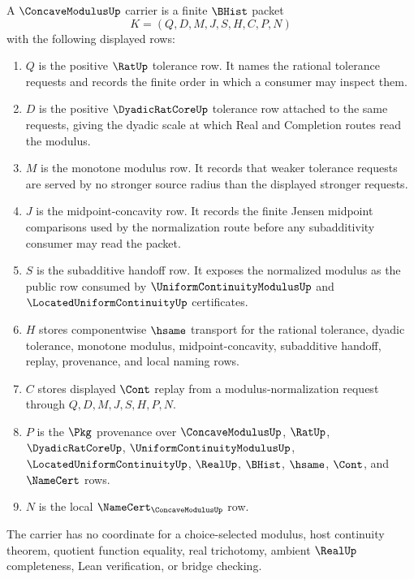 \begin{definition}
\label{def:concave-modulus-carrier}
A $\ConcaveModulusUp$ carrier is a finite $\BHist$ packet
$$
K=(Q,D,M,J,S,H,C,P,N)
$$
with the following displayed rows:
\begin{enumerate}
\item $Q$ is the positive $\RatUp$ tolerance row. It names the rational tolerance requests and records the finite order in which a consumer may inspect them.
\item $D$ is the positive $\DyadicRatCoreUp$ tolerance row attached to the same requests, giving the dyadic scale at which Real and Completion routes read the modulus.
\item $M$ is the monotone modulus row. It records that weaker tolerance requests are served by no stronger source radius than the displayed stronger requests.
\item $J$ is the midpoint-concavity row. It records the finite Jensen midpoint comparisons used by the normalization route before any subadditivity consumer may read the packet.
\item $S$ is the subadditive handoff row. It exposes the normalized modulus as the public row consumed by $\UniformContinuityModulusUp$ and $\LocatedUniformContinuityUp$ certificates.
\item $H$ stores componentwise $\hsame$ transport for the rational tolerance, dyadic tolerance, monotone modulus, midpoint-concavity, subadditive handoff, replay, provenance, and local naming rows.
\item $C$ stores displayed $\Cont$ replay from a modulus-normalization request through $Q,D,M,J,S,H,P,N$.
\item $P$ is the $\Pkg$ provenance over $\ConcaveModulusUp$, $\RatUp$, $\DyadicRatCoreUp$, $\UniformContinuityModulusUp$, $\LocatedUniformContinuityUp$, $\RealUp$, $\BHist$, $\hsame$, $\Cont$, and $\NameCert$ rows.
\item $N$ is the local $\NameCert_{\ConcaveModulusUp}$ row.
\end{enumerate}
The carrier has no coordinate for a choice-selected modulus, host continuity theorem, quotient function equality, real trichotomy, ambient $\RealUp$ completeness, Lean verification, or bridge checking.
\end{definition}

